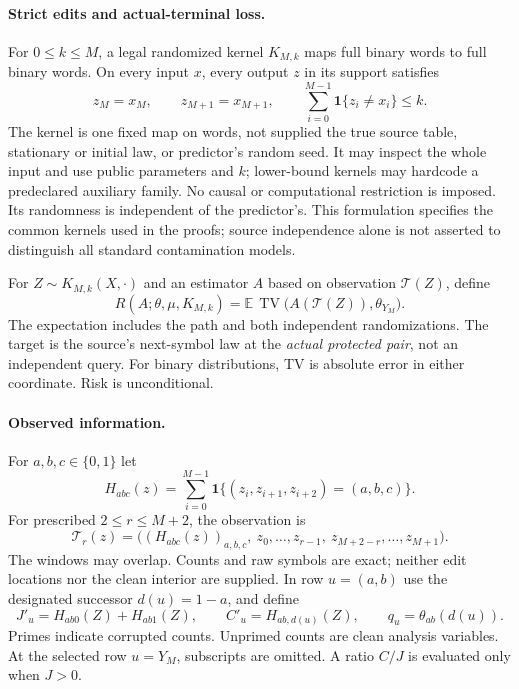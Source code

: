 \documentclass[11pt,letterpaper]{article}
\newcommand{\TV}{\operatorname{TV}}
\newcommand{\E}{\mathbb E}
\newcommand{\ind}{\mathbf 1}
\newcommand{\cT}{\mathcal T}
\theoremstyle{definition}
\theoremstyle{remark}
\numberwithin{equation}{section}
\begin{document}
\paragraph{Strict edits and actual-terminal loss.}
For $0\le k\le M$, a legal randomized kernel $K_{M,k}$ maps full binary words to full binary words. On every input $x$, every output $z$ in its support satisfies
\begin{equation}\label{eq:attack}
 z_M=x_M,\qquad z_{M+1}=x_{M+1},\qquad
 \sum_{i=0}^{M-1}\ind\{z_i\ne x_i\}\le k.
\end{equation}
The kernel is one fixed map on words, not supplied the true source table, stationary or initial law, or predictor's random seed. It may inspect the whole input and use public parameters and $k$; lower-bound kernels may hardcode a predeclared auxiliary family. No causal or computational restriction is imposed. Its randomness is independent of the predictor's. This formulation specifies the common kernels used in the proofs; source independence alone is not asserted to distinguish all standard contamination models.

For $Z\sim K_{M,k}(X,\cdot)$ and an estimator $A$ based on observation $\cT(Z)$, define
\begin{equation}\label{eq:risk}
 R(A;\theta,\mu,K_{M,k})
 =\E\,\TV\bigl(A(\cT(Z)),\theta_{Y_M}\bigr).
\end{equation}
The expectation includes the path and both independent randomizations. The target is the source's next-symbol law at the \emph{actual protected pair}, not an independent query. For binary distributions, TV is absolute error in either coordinate. Risk is unconditional.

\paragraph{Observed information.}
For $a,b,c\in\{0,1\}$ let
\[
 H_{abc}(z)=\sum_{i=0}^{M-1}\ind\{(z_i,z_{i+1},z_{i+2})=(a,b,c)\}.
\]
For prescribed $2\le r\le M+2$, the observation is
\begin{equation}\label{eq:observation}
 \cT_r(z)=\bigl((H_{abc}(z))_{a,b,c},\ z_0,\ldots,z_{r-1},\
 z_{M+2-r},\ldots,z_{M+1}\bigr).
\end{equation}
The windows may overlap. Counts and raw symbols are exact; neither edit locations nor the clean interior are supplied. In row $u=(a,b)$ use the designated successor $d(u)=1-a$, and define
\[
 J'_u=H_{ab0}(Z)+H_{ab1}(Z),\qquad C'_u=H_{ab,d(u)}(Z),\qquad
 q_u=\theta_{ab}(d(u)).
\]
Primes indicate corrupted counts. Unprimed counts are clean analysis variables. At the selected row $u=Y_M$, subscripts are omitted. A ratio $C/J$ is evaluated only when $J>0$.
\end{document}

